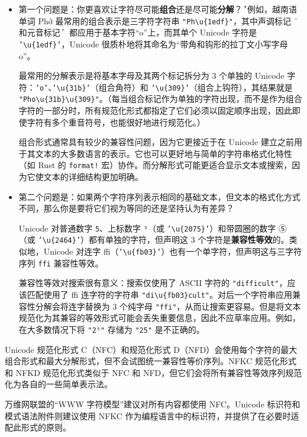 \begin{itemize}
\item 第一个问题是：你更喜欢让字符尽可能\textbf{组合}还是尽可能\textbf{分解}？
̛̛
例如，越南语单词 Phở 最常用的组合表示是三字符字符串 \texttt{"Ph\textbackslash{}u\{1edf\}"}，其中声调标记  ̉ 和元音标记 ̛  都应用于基本字符“o”上，而其单个 Unicode 字符是 \texttt{'\textbackslash{}u\{1edf\}'}，Unicode 很质朴地将其命名为“带角和钩形的拉丁文小写字母 o”。

最常用的分解表示是将基本字母及其两个标记拆分为 3 个单独的 Unicode 字符：\texttt{'o'}、\texttt{'\textbackslash{}u\{31b\}'}（组合角符）和 \texttt{'\textbackslash{}u\{309\}'}（组合上钩符），其结果就是 \texttt{"Pho\textbackslash{}u\{31b\}\textbackslash{}u\{309\}"}。（每当组合标记作为单独的字符出现，而不是作为组合字符的一部分时，所有规范化形式都指定了它们必须以固定顺序出现，因此即使字符有多个重音符号，也能很好地进行规范化。）

组合形式通常具有较少的兼容性问题，因为它更接近于在 Unicode 建立之前用于其文本的大多数语言的表示。它也可以更好地与简单的字符串格式化特性（如 Rust 的 \texttt{format!} 宏）协作。而分解形式可能更适合显示文本或搜索，因为它使文本的详细结构更加明确。
\item 第二个问题是：如果两个字符序列表示相同的基础文本，但文本的格式化方式不同，那么你是要将它们视为等同的还是坚持认为有差异？

Unicode 对普通数字 \texttt{5}、上标数字 \texttt{⁵}（或 \texttt{'\textbackslash{}u\{2075\}'}）和带圆圈的数字 ⑤（或 \texttt{'\textbackslash{}u\{2464\}'}）都有单独的字符，但声明这 3 个字符是\textbf{兼容性等效}的。类似地，Unicode 对连字 ffi（\texttt{'\textbackslash{}u\{fb03\}'}）也有一个单字符，但声明这与三字符序列 \texttt{ffi} 兼容性等效。

兼容性等效对搜索很有意义：搜索仅使用了 ASCII 字符的 \texttt{"difficult"}，应该匹配使用了 ffi 连字符的字符串 \texttt{"di\textbackslash{}u\{fb03\}cult"}。对后一个字符串应用兼容性分解会将连字替换为 3 个纯字母 \texttt{"ffi"}，从而让搜索更容易。但是将文本规范化为其兼容的等效形式可能会丢失重要信息，因此不应草率应用。例如，在大多数情况下将 \texttt{"2⁵"} 存储为 \texttt{"25"} 是不正确的。
\end{itemize}

Unicode 规范化形式 C（NFC）和规范化形式 D（NFD）会使用每个字符的最大组合形式和最大分解形式，但不会试图统一兼容性等价序列。NFKC 规范化形式和 NFKD 规范化形式类似于 NFC 和 NFD，但它们会将所有兼容性等效序列规范化为各自的一些简单表示法。

万维网联盟的“WWW 字符模型”建议对所有内容都使用 NFC。Unicode 标识符和模式语法附件则建议使用 NFKC 作为编程语言中的标识符，并提供了在必要时适配此形式的原则。

